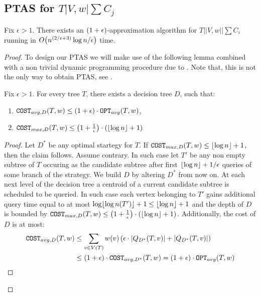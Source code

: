 \subsection{PTAS for $T|V,w|\sum C_j$}
\begin{theorem}
    Fix $\epsilon>1$. There exists an $\mathopen{}\left( 1+\epsilon \right)$-approximation algorithm for $T||V, w||\sum C_i$ running in $O\mathopen{}\left( n^{\mathopen{}\left( 2/\epsilon+3 \right)}\log n/\epsilon \right)$ time.
    \begin{proof}

To design our PTAS we will make use of the following lemma combined with a non trivial dynamic programming procedure due to \cite{Cicalese2014ImprovedApproxAvgTs,Angelidakis2018ShortestPQ, Berendsohn2024}. Note that, this is not the only way to obtain PTAS, see \cite{SplayTonT}.
\begin{lemma}\label{ptas_lemma}
Fix $\epsilon>1$. For every tree $T$, there exists a decision tree $D$, such that:
\begin{enumerate}
    \item $\texttt{COST}_{avg,D}\mathopen{}\left( T,w \right)\leq \mathopen{}\left( 1+\epsilon \right)\cdot\texttt{OPT}_{avg}\mathopen{}\left( T,w \right)$,
    \item $\texttt{COST}_{max,D}\mathopen{}\left( T,w \right)\leq \mathopen{}\left( 1+\frac{1}{\epsilon} \right)\cdot\mathopen{}\left( \mathopen{}\left\lfloor \log n \right\rfloor+1 \right)$
\end{enumerate} 
\begin{proof}
Let $D^*$ be any optimal startegy for $T$. If  $\texttt{COST}_{max,D}\mathopen{}\left( T,w \right)\leq \mathopen{}\left\lfloor \log n \right\rfloor+1$, then the claim follows. Assume contrary. In such case let $T'$ be any non empty subtree of $T$ occuring as the candidate subtree after first ${\mathopen{}\left\lfloor \log n \right\rfloor+1}/{\epsilon}$ queries of some branch of the strategy. We build $D$ by altering $D^*$ from now on. At each next level of the decision tree a centroid of a current candidate subtree is scheduled to be queried. In such case each vertex belonging to $T'$ gains additional query time equal to at most $\log \mathopen{}\left\lfloor \log n\mathopen{}\left( T' \right) \right\rfloor+1\leq \mathopen{}\left\lfloor \log n \right\rfloor+1$ and the depth of $D$ is bounded by $\texttt{COST}_{max,D}\mathopen{}\left( T,w \right)\leq \mathopen{}\left( 1+\frac{1}{\epsilon} \right)\cdot\mathopen{}\left( \mathopen{}\left\lfloor \log n \right\rfloor+1 \right)$. Additionally, the cost of $D$ is at most:
\begin{align*}
    \texttt{COST}_{avg,D}\mathopen{}\left( T,w \right)&\leq 
\sum_{v \in V\mathopen{}\left( T \right)}w\mathopen{}\left( v \right)\mathopen{}\left( \epsilon\cdot \mathopen{}\left| Q_{D^*}\mathopen{}\left( T,v \right) \right|+\mathopen{}\left| Q_{D^*}\mathopen{}\left( T,v \right) \right| \right)
\\&\leq
\mathopen{}\left( 1+\epsilon \right)\cdot \texttt{COST}_{avg,D^*}\mathopen{}\left( T,w \right)=
\mathopen{}\left( 1+\epsilon \right)\cdot\texttt{OPT}_{avg}\mathopen{}\left( T,w \right)
\end{align*}

\end{proof}
\end{lemma}


\end{proof}
\end{theorem}
